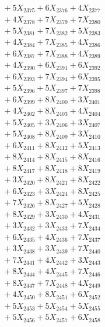 \documentclass[a4paper,10pt]{article}
\begin{document}
{\begin{align}
&\;  + 5 X_{2375} + 6 X_{2376} + 4 X_{2377} \\[0.3ex]
&\;  + 4 X_{2378} + 7 X_{2379} + 7 X_{2380} \\[0.5ex]\allowbreak
&\;  + 5 X_{2381} + 7 X_{2382} + 5 X_{2383} \\[0.3ex]
&\;  + 4 X_{2384} + 7 X_{2385} + 4 X_{2386} \\[0.3ex]
&\;  + 6 X_{2387} + 7 X_{2388} + 4 X_{2389} \\[0.3ex]
&\;  + 4 X_{2390} + 6 X_{2391} + 6 X_{2392} \\[0.3ex]
&\;  + 6 X_{2393} + 7 X_{2394} + 6 X_{2395} \\[0.3ex]
&\;  + 5 X_{2396} + 5 X_{2397} + 7 X_{2398} \\[0.3ex]
&\;  + 6 X_{2399} + 8 X_{2400} + 3 X_{2401} \\[0.3ex]
&\;  + 4 X_{2402} + 8 X_{2403} + 4 X_{2404} \\[0.3ex]
&\;  + 5 X_{2405} + 3 X_{2406} + 3 X_{2407} \\[0.3ex]
&\;  + 5 X_{2408} + 8 X_{2409} + 3 X_{2410} \\[0.5ex]\allowbreak
&\;  + 6 X_{2411} + 8 X_{2412} + 5 X_{2413} \\[0.3ex]
&\;  + 8 X_{2414} + 8 X_{2415} + 8 X_{2416} \\[0.3ex]
&\;  + 8 X_{2417} + 8 X_{2418} + 8 X_{2419} \\[0.3ex]
&\;  + 3 X_{2420} + 8 X_{2421} + 8 X_{2422} \\[0.3ex]
&\;  + 6 X_{2423} + 3 X_{2424} + 8 X_{2425} \\[0.3ex]
&\;  + 7 X_{2426} + 8 X_{2427} + 5 X_{2428} \\[0.3ex]
&\;  + 8 X_{2429} + 3 X_{2430} + 4 X_{2431} \\[0.3ex]
&\;  + 3 X_{2432} + 3 X_{2433} + 7 X_{2434} \\[0.3ex]
&\;  + 6 X_{2435} + 4 X_{2436} + 7 X_{2437} \\[0.3ex]
&\;  + 3 X_{2438} + 3 X_{2439} + 7 X_{2440} \\[0.5ex]\allowbreak
&\;  + 7 X_{2441} + 4 X_{2442} + 3 X_{2443} \\[0.3ex]
&\;  + 8 X_{2444} + 4 X_{2445} + 7 X_{2446} \\[0.3ex]
&\;  + 8 X_{2447} + 7 X_{2448} + 4 X_{2449} \\[0.3ex]
&\;  + 4 X_{2450} + 8 X_{2451} + 6 X_{2452} \\[0.3ex]
&\;  + 5 X_{2453} + 5 X_{2454} + 5 X_{2455} \\[0.3ex]
&\;  + 5 X_{2456} + 5 X_{2457} + 6 X_{2458} \\[0.3ex]

\end{align}}
\end{document}
